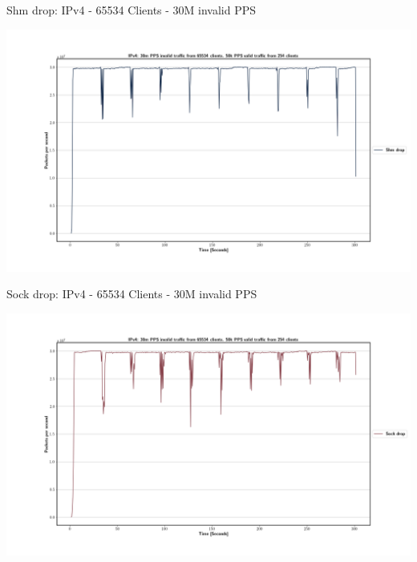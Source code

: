 \documentclass[11pt,english,table,dvipsnames]{beamer}
\begin{document}
\begin{frame}{Shm drop: IPv4 - 65534 Clients - 30M invalid PPS}
    \begin{center}
        \includegraphics[width=1.\linewidth]{images/IPv4_30m_65534_1_shm_drop.png}
    \end{center}
\end{frame}

\begin{frame}{Sock drop: IPv4 - 65534 Clients - 30M invalid PPS}
    \begin{center}
        \includegraphics[width=1.\linewidth]{images/IPv4_30m_65534_1_sock_drop.png}
    \end{center}
\end{frame}
\end{document}

